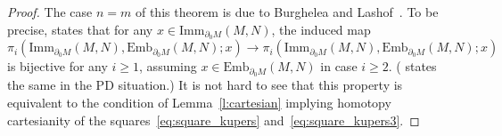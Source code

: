 \documentclass[11pt]{amsart}
\theoremstyle{definition}
\newcommand{\Emb}{\mathrm{Emb}}
\newcommand{\Imm}{\mathrm{Imm}}
\newcommand{\tImm}{\mathrm{tImm}}
\newcommand{\tEmb}{\mathrm{tEmb}}
\newcommand{\hofiber}{\mathrm{hofiber}}
\numberwithin{equation}{section}
\begin{document}
\begin{proof}
The case $n=m$ of this theorem is due to Burghelea and Lashof~\cite{BL_diff}.  %
 To be precise, 
\cite[Theorem~3.1(a)]{BL_diff} states that for any $x\in \Imm_{\partial_0 M}(M,N)$, the induced map
\begin{equation}\label{eq:BL_bijection}
\pi_i (\Imm_{\partial_0 M}(M,N), \Emb_{\partial_0 M}(M,N);x)\to \pi_i (\Imm_{\partial_0 M}(M,N), \Emb_{\partial_0 M}(M,N);x)
\end{equation}
is bijective for any $i\geq 1$, assuming $x\in\Emb_{\partial_0 M}(M,N)$ in case $i\geq 2$.  (\cite[Theorem~3.1(b)]{BL_diff} states the same in the PD situation.) It is not hard to see that this property is
equivalent to the condition of Lemma~\ref{l:cartesian}
implying
homotopy cartesianity of the squares~\eqref{eq:square_kupers} and~\eqref{eq:square_kupers3}.  


\end{proof}
\end{document}

